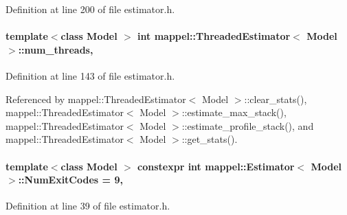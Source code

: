 Definition at line 200 of file estimator.\+h.

\paragraph[{\texorpdfstring{num\+\_\+threads}{num_threads}}]{\setlength{\rightskip}{0pt plus 5cm}template$<$class Model $>$ int {\bf mappel\+::\+Threaded\+Estimator}$<$ Model $>$\+::num\+\_\+threads\hspace{0.3cm}{\ttfamily [protected]}, {\ttfamily [inherited]}}\hypertarget{classmappel_1_1ThreadedEstimator_a6afa05d7d971f3317ce1602de853123b}{}\label{classmappel_1_1ThreadedEstimator_a6afa05d7d971f3317ce1602de853123b}


Definition at line 143 of file estimator.\+h.



Referenced by mappel\+::\+Threaded\+Estimator$<$ Model $>$\+::clear\+\_\+stats(), mappel\+::\+Threaded\+Estimator$<$ Model $>$\+::estimate\+\_\+max\+\_\+stack(), mappel\+::\+Threaded\+Estimator$<$ Model $>$\+::estimate\+\_\+profile\+\_\+stack(), and mappel\+::\+Threaded\+Estimator$<$ Model $>$\+::get\+\_\+stats().

\paragraph[{\texorpdfstring{Num\+Exit\+Codes}{NumExitCodes}}]{\setlength{\rightskip}{0pt plus 5cm}template$<$class Model $>$ constexpr int {\bf mappel\+::\+Estimator}$<$ Model $>$\+::Num\+Exit\+Codes = 9\hspace{0.3cm}{\ttfamily [static]}, {\ttfamily [inherited]}}\hypertarget{classmappel_1_1Estimator_afcec036c4d78c12d427e0a733a00a48e}{}\label{classmappel_1_1Estimator_afcec036c4d78c12d427e0a733a00a48e}


Definition at line 39 of file estimator.\+h.

